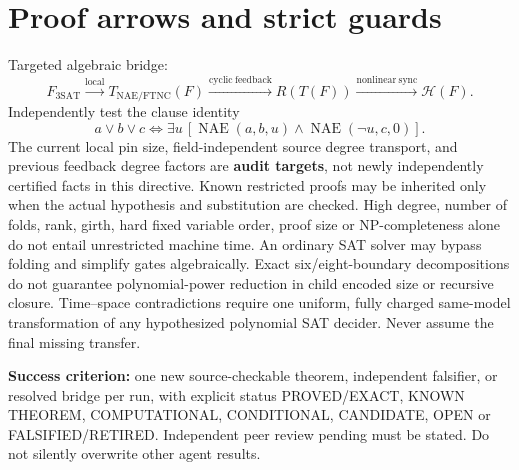 \documentclass[11pt]{article}
\begin{document}
\section*{Proof arrows and strict guards}
Targeted algebraic bridge:
\[
F_{\mathrm{3SAT}}\xrightarrow{\mathrm{local}}T_{\mathrm{NAE/FTNC}}(F)
\xrightarrow{\mathrm{cyclic\ feedback}}R(T(F))
\xrightarrow{\mathrm{nonlinear\ sync}}\mathcal H(F).
\]
Independently test the clause identity
\[
a\vee b\vee c\iff\exists u\,[
\operatorname{NAE}(a,b,u)\land\operatorname{NAE}(\neg u,c,0)].
\]
The current local pin size, field-independent source degree transport, and previous feedback degree factors are \textbf{audit targets}, not newly independently certified facts in this directive. Known restricted proofs may be inherited only when the actual hypothesis and substitution are checked. High degree, number of folds, rank, girth, hard fixed variable order, proof size or NP-completeness alone do not entail unrestricted machine time. An ordinary SAT solver may bypass folding and simplify gates algebraically. Exact six/eight-boundary decompositions do not guarantee polynomial-power reduction in child encoded size or recursive closure. Time--space contradictions require one uniform, fully charged same-model transformation of any hypothesized polynomial SAT decider. Never assume the final missing transfer.

\noindent\textbf{Success criterion:} one new source-checkable theorem, independent falsifier, or resolved bridge per run, with explicit status PROVED/EXACT, KNOWN THEOREM, COMPUTATIONAL, CONDITIONAL, CANDIDATE, OPEN or FALSIFIED/RETIRED. Independent peer review pending must be stated. Do not silently overwrite other agent results. 
\end{document}
